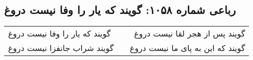 \begin{center}
\section*{رباعی شماره ۱۰۵۸: گویند که یار را وفا نیست دروغ}
\label{sec:1058}
\begin{longtable}{l p{0.5cm} r}
گویند که یار را وفا نیست دروغ
&&
گویند پس از هجر لقا نیست دروغ
\\
گویند شراب جانفزا نیست دروغ
&&
گویند که این به پای ما نیست دروغ
\\
\end{longtable}
\end{center}
